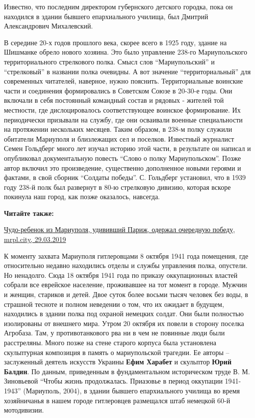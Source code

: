 Известно, что последним директором губернского детского городка, пока он
находился в здании бывшего епархиального училища, был Дмитрий Александрович
Михалевский.


В середине 20-х годов прошлого века, скорее всего в 1925 году, здание на
Шишманке обрело нового хозяина. Это было управление 238-го Мариупольского
территориального стрелкового полка. Смысл слов \enquote{Мариупольский} и \enquote{стрелковый} в
названии полка очевидны. А вот значение \enquote{территориальный} для современных
читателей, наверное, нужно пояснить. Территориальные воинские части и
соединения формировались в Советском Союзе в 20-30-е годы. Они включали в себя
постоянный командный состав и рядовых - жителей той местности, где
дислоцировалось соответствующее воинское формирование. Их периодически
призывали на службу, где они осваивали военные специальности на протяжении
нескольких месяцев. Таким образом, в 238-м полку служили обитатели Мариуполя и
близлежащих сел и поселков. Известный журналист Семен Гольдберг много лет
изучал историю этой части, в результате он написал и опубликовал документальную
повесть \enquote{Слово о полку Мариупольском}. Позже автор включил это произведение,
существенно дополненное новыми героями и фактами, в свой сборник \enquote{Солдаты
победы}. С. Гольдберг установил, что в 1939 году 238-й полк был развернут в
80-ю стрелковую дивизию, которая вскоре покинула наш город, как позже
оказалось, навсегда.

\textbf{Читайте также:} 

\href{https://mrpl.city/news/view/chudo-rebenok-iz-mariupolya-udivivshij-parizh-oderzhal-ocherednuyu-pobedu-foto}{%
Чудо-ребенок из Мариуполя, удививший Париж, одержал очередную победу, mrpl.city, 29.03.2019}

К моменту захвата Мариуполя гитлеровцами 8 октября 1941 года помещения, где
относительно недавно находились отделы и службы управления полка, опустели. Но
ненадолго. Сюда 18 октября 1941 года по приказу оккупационных властей собрали
все еврейское население, проживавшее на тот момент в городе. Мужчин и женщин,
стариков и детей. Двое суток более восьми тысяч человек без воды, в страшной
тесноте и полном неведении о том, что их ожидает в будущем, находились в здании
полка под охраной немецких солдат. Они были полностью изолированы от внешнего
мира. Утром 20 октября их повели в сторону поселка Агробаза. Там, у
противотанкового рва ни в чем не повинные люди были расстреляны. Много позже на
стене старого корпуса была установлена скульптурная композиция в память о
мариупольской трагедии. Ее авторы – заслуженный деятель искусств Украины \textbf{Ефим
Харабет} и скульптор \textbf{Юрий Балдин}. По данным, приведенным в фундаментальном
историческом труде В. М. Зиновьевой \enquote{Чтобы жизнь продолжалась.
Приазовье в период оккупации 1941-1943} (Мариуполь, 2004), в здании бывшего
епархиального училища во время хозяйничанья в нашем городе гитлеровцев
размещался штаб немецкой 60-й мотодивизии. 

